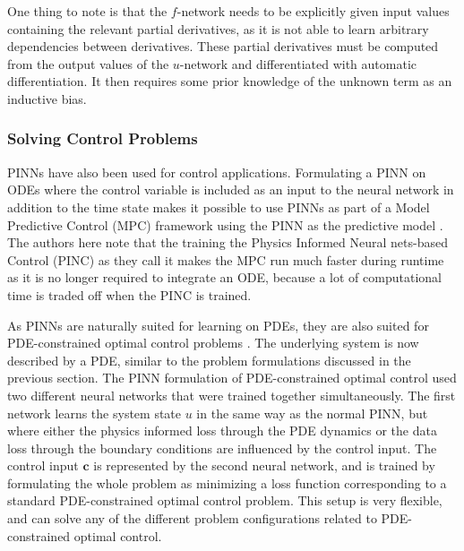 One thing to note is that the $f$-network needs to be explicitly given input values containing the relevant partial derivatives, as it is not able to learn arbitrary dependencies between derivatives. These partial derivatives must be computed from the output values of the $u$-network and differentiated with automatic differentiation. It then requires some prior knowledge of the unknown term as an inductive bias.

\subsubsection{Solving Control Problems}

PINNs have also been used for control applications. Formulating a PINN on ODEs where the control variable is included as an input to the neural network in addition to the time state makes it possible to use PINNs as part of a Model Predictive Control (MPC) framework using the PINN as the predictive model \cite{pinncontroldynamical}. The authors here note that the training the Physics Informed Neural nets-based Control (PINC) as they call it makes the MPC run much faster during runtime as it is no longer required to integrate an ODE, because a lot of computational time is traded off when the PINC is trained.

As PINNs are naturally suited for learning on PDEs, they are also suited for PDE-constrained optimal control problems \cite{pinnoptimalcontrol}. The underlying system is now described by a PDE, similar to the problem formulations discussed in the previous section. The PINN formulation of PDE-constrained optimal control \cite{pinnoptimalcontrol} used two different neural networks that were trained together simultaneously. The first network learns the system state $u$ in the same way as the normal PINN, but where either the physics informed loss through the PDE dynamics or the data loss through the boundary conditions are influenced by the control input. The control input $\bm{c}$ is represented by the second neural network, and is trained by formulating the whole problem as minimizing a loss function corresponding to a standard PDE-constrained optimal control problem. This setup is very flexible, and can solve any of the different problem configurations related to PDE-constrained optimal control.

